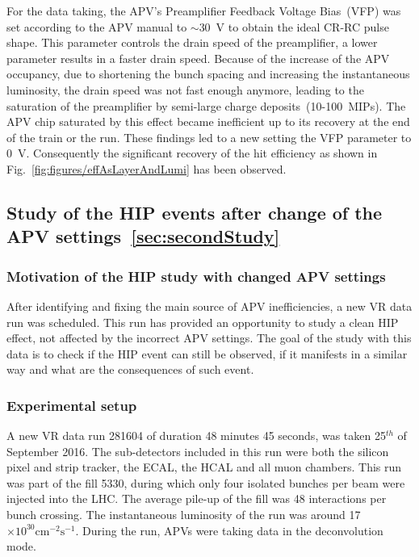 For the data taking, the APV's Preamplifier Feedback Voltage Bias~(VFP) was set according to the APV manual to $\sim$30~V to obtain the ideal CR-RC pulse shape. This parameter controls the drain speed of the preamplifier, a lower parameter results in a faster drain speed. Because of the increase of the APV occupancy, due to shortening the bunch spacing and increasing the instantaneous luminosity, the drain speed was not fast enough anymore, leading to the saturation of the preamplifier by semi-large charge deposits~(10-100~MIPs). The APV chip saturated by this effect became inefficient up to its recovery at the end of the train or the run. These findings led to a new setting the VFP parameter to 0~V. Consequently the significant recovery of the hit efficiency as shown in Fig.~\ref{fig:figures/effAsLayerAndLumi} has been observed.


\subsection{Study of the HIP events after change of the APV settings~\ref{sec:secondStudy}}

\subsubsection{Motivation of the HIP study with changed APV settings}

After identifying and fixing the main source of APV inefficiencies, a new VR data run was scheduled. This run has provided an opportunity to study a clean HIP effect, not affected by the incorrect APV settings. The goal of the study with this data is to check if the HIP event can still be observed, if it manifests in a similar way and what are the consequences of such event.


\subsubsection{Experimental setup}

A new VR data run 281604 of duration 48 minutes 45 seconds, was taken 25$^{th}$ of September 2016. The sub-detectors included in this run were both the silicon pixel and strip tracker, the ECAL, the HCAL and all muon chambers. This run was part of the fill 5330, during which only four isolated bunches per beam were injected into the LHC. The average pile-up of the fill was 48 interactions per bunch crossing. The instantaneous luminosity of the run was around 17$\times 10^{30} \mathrm{cm^{-2} s^{-1}}$. During the run, APVs were taking data in the deconvolution mode. 

